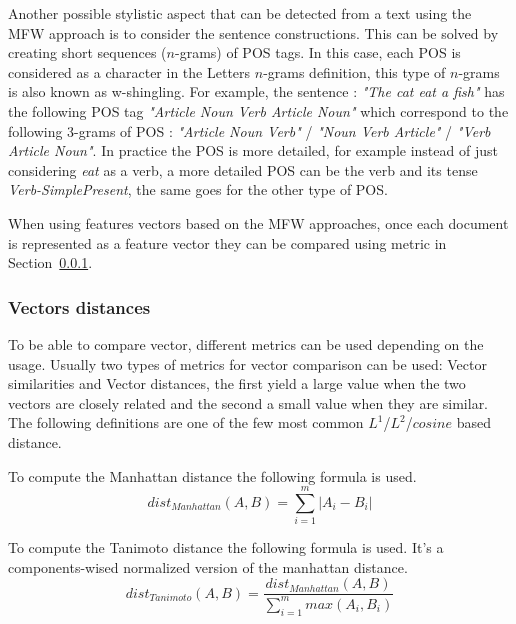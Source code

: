 Another possible stylistic aspect that can be detected from a text using the MFW approach is to consider the sentence constructions.
This can be solved by creating short sequences ($n$-grams) of POS tags.
In this case, each POS is considered as a character in the Letters $n$-grams definition, this type of $n$-grams is also known as w-shingling.
For example, the sentence : \textit{"The cat eat a fish"} has the following POS tag \textit{"Article Noun Verb Article Noun"} which correspond to the following 3-grams of POS : \textit{"Article Noun Verb"} / \textit{"Noun Verb Article"} / \textit{"Verb Article Noun"}.
In practice the POS is more detailed, for example instead of just considering \textit{eat} as a verb, a more detailed POS can be the verb and its tense \textit{Verb-SimplePresent}, the same goes for the other type of POS.

When using features vectors based on the MFW approaches, once each document is represented as a feature vector they can be compared using metric in Section~\ref{sec:fv_distances}.

\subsubsection{Vectors distances}
\label{sec:fv_distances}

To be able to compare vector, different metrics can be used depending on the usage.
Usually two types of metrics for vector comparison can be used: Vector similarities and Vector distances, the first yield a large value when the two vectors are closely related and the second a small value when they are similar.
The following definitions are one of the few most common $L^1$/$L^2$/$cosine$ based distance.

\begin{definition}
  To compute the Manhattan distance the following formula is used.
  \begin{equation}
    dist_{Manhattan}(A, B) = \sum_{i=1}^{m} |A_i - B_i|
  \end{equation}
\end{definition}

\begin{definition}
  To compute the Tanimoto distance the following formula is used.
  It's a components-wised normalized version of the manhattan distance.
  \begin{equation}
    dist_{Tanimoto}(A, B) = \frac{dist_{Manhattan}(A, B)}{\sum_{i=1}^{m} max(A_i, B_i)}
  \end{equation}
\end{definition}

